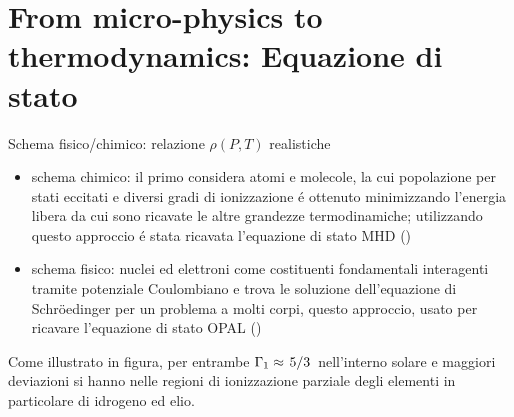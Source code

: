 \section{From micro-physics to thermodynamics: Equazione di stato}


\begin{wordonframe}{Schema fisico/chimico: relazione $\rho(P,T)$ realistiche}
\begin{itemize}
\item schema  chimico: il primo considera atomi e molecole, la cui popolazione per stati eccitati e diversi gradi di ionizzazione \'e ottenuto minimizzando l'energia libera da cui sono ricavate le altre grandezze termodinamiche; utilizzando questo approccio \'e stata ricavata l'equazione di stato MHD (\cite{hummer1988equation})
\item schema fisico: nuclei ed elettroni come costituenti fondamentali interagenti tramite potenziale Coulombiano e trova le soluzione dell'equazione di Schr\"oedinger per un problema a molti corpi, questo approccio, usato per ricavare l'equazione di stato OPAL (\cite{rogers1986occupation})
\end{itemize}
Come illustrato in figura, per entrambe $\Gamma_1\approx\left.{5}\middle/{3}\right.$ nell'interno solare e maggiori deviazioni si hanno nelle regioni di ionizzazione parziale degli elementi in particolare di idrogeno ed elio.
\end{wordonframe}

